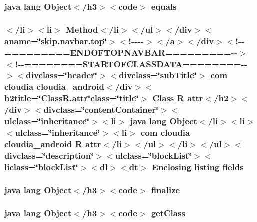 \hypertarget{_r_8attr_8html_a8974318cea585f72df717e0380ec7104}{
\subsubsection[{equals}]{\setlength{\rightskip}{0pt plus 5cm}java lang Object$<$/h3$>$$<$code$>$ equals}}\label{_r_8attr_8html_a8974318cea585f72df717e0380ec7104}
\hypertarget{_r_8attr_8html_a56bbec210cbecf959515d463816d863a}{
\subsubsection[{fields}]{\setlength{\rightskip}{0pt plus 5cm}$<$/li$>$$<$li$>$ Method$<$/li$>$$<$/ul$>$$<$/div$>$$<$aname=\char`\"{}skip.\-navbar.\-top\char`\"{}$>$$<$!-\/-\/-\/-\/$>$$<$/a$>$$<$/div$>$$<$!-\/-\/=========E\-N\-D\-O\-F\-T\-O\-P\-N\-A\-V\-B\-A\-R=========-\/-\/$>$$<$!-\/-\/========S\-T\-A\-R\-T\-O\-F\-C\-L\-A\-S\-S\-D\-A\-T\-A========-\/-\/$>$$<$divclass=\char`\"{}header\char`\"{}$>$$<$divclass=\char`\"{}sub\-Title\char`\"{}$>$ com cloudia cloudia\-\_\-android$<$/div$>$$<$h2title=\char`\"{}Class\-R.\-attr\char`\"{}class=\char`\"{}title\char`\"{}$>$ Class {\bf R} attr$<$/h2$>$$<$/div$>$$<$divclass=\char`\"{}content\-Container\char`\"{}$>$$<$ulclass=\char`\"{}inheritance\char`\"{}$>$$<$li$>$ java lang Object$<$/li$>$$<$li$>$$<$ulclass=\char`\"{}inheritance\char`\"{}$>$$<$li$>$ com cloudia cloudia\-\_\-android {\bf R} attr$<$/li$>$$<$/ul$>$$<$/li$>$$<$/ul$>$$<$divclass=\char`\"{}description\char`\"{}$>$$<$ulclass=\char`\"{}block\-List\char`\"{}$>$$<$liclass=\char`\"{}block\-List\char`\"{}$>$$<$dl$>$$<${\bf dt}$>$ Enclosing listing fields}}\label{_r_8attr_8html_a56bbec210cbecf959515d463816d863a}
\hypertarget{_r_8attr_8html_ab2315181ead4aeedef2374039b6ddde7}{
\subsubsection[{finalize}]{\setlength{\rightskip}{0pt plus 5cm}java lang Object$<$/h3$>$$<$code$>$ finalize}}\label{_r_8attr_8html_ab2315181ead4aeedef2374039b6ddde7}
\hypertarget{_r_8attr_8html_a98e6644727fe65eac217a6855045be43}{
\subsubsection[{get\-Class}]{\setlength{\rightskip}{0pt plus 5cm}java lang Object$<$/h3$>$$<$code$>$ get\-Class}}\label{_r_8attr_8html_a98e6644727fe65eac217a6855045be43}

